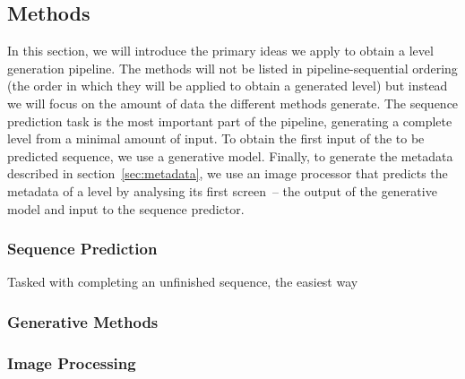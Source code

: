 \subsection{Methods}

In this section, we will introduce the primary ideas we apply to obtain
a level generation pipeline. The methods will not be listed in
pipeline-sequential ordering (the order in which they will be applied to
obtain a generated level) but instead we will focus on the amount of
data the different methods generate. The sequence prediction task is the
most important part of the pipeline, generating a complete level from a
minimal amount of input. To obtain the first input of the to be
predicted sequence, we use a generative model. Finally, to generate the
metadata described in section~\ref{sec:metadata}, we use an image
processor that predicts the metadata of a level by analysing its first
screen~-- the output of the generative model and input to the sequence
predictor.

\subsubsection{Sequence Prediction}

Tasked with completing an unfinished sequence, the easiest way


\subsubsection{Generative Methods}



\subsubsection{Image Processing}





